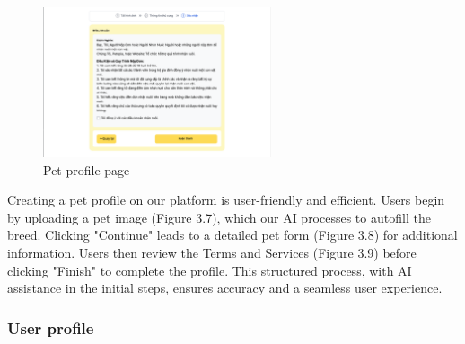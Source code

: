 \begin {figure}[H]
\centering
\includegraphics[width=0.6\textwidth]{Figures/UI/term_ui.png}
\caption{Pet profile page}
\end{figure}

Creating a pet profile on our platform is user-friendly and efficient. Users begin by uploading a pet image (Figure 3.7), which our AI processes to autofill the breed. Clicking "Continue" leads to a detailed pet form (Figure 3.8) for additional information. Users then review the Terms and Services (Figure 3.9) before clicking "Finish" to complete the profile. This structured process, with AI assistance in the initial steps, ensures accuracy and a seamless user experience.

\subsubsection{User profile}

